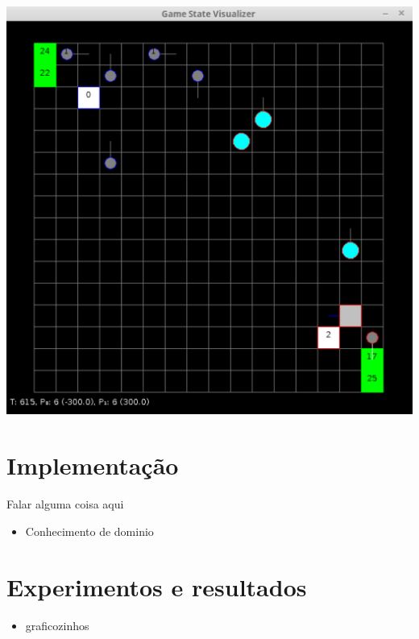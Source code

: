 \documentclass[a0,portrait]{a0poster}
\begin{document}
\begin{multicols}{2}
\vspace{10mm}

\begin{center}
	\includegraphics[width=0.6\linewidth]{microRts.pdf}
\end{center}	


\color{NavyBlue}
\section*{\huge Implementa\c{c}\~ao}
\color{Black}

Falar alguma coisa aqui

\vspace{10mm}

\begin{itemize}
	\item Conhecimento de dominio
\end{itemize}


\color{NavyBlue}
\section*{\huge Experimentos e resultados}
\color{Black}

\begin{itemize}
	\item graficozinhos
\end{itemize}


\vspace{13mm}




\end{multicols}
\end{document}
